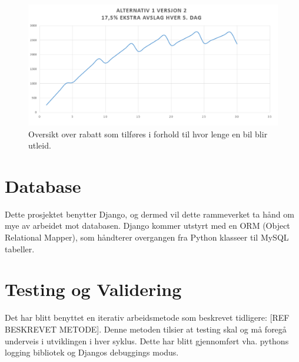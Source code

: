  \begin{figure}[htbp]
	\centering
		\includegraphics[scale=0.5]{Bilder/avslag.png}
	\caption[Utleiepris Diagram]{Oversikt over rabatt som tilføres i forhold til hvor lenge en bil blir utleid. } %
	\label{fig:price_reduction}
\end{figure}








\clearpage
\section{Database}
Dette prosjektet benytter Django, og dermed vil dette rammeverket ta hånd om mye av arbeidet mot databasen. Django kommer utstyrt med en ORM (Object Relational Mapper), som håndterer overgangen fra Python klasseer til MySQL tabeller. 

\clearpage
\section{Testing og Validering}
Det har blitt benyttet en iterativ arbeidsmetode som beskrevet tidligere: [REF BESKREVET METODE]. Denne metoden tilsier at testing skal og må foregå underveis i utviklingen i hver syklus. Dette har blitt gjennomført vha. pythons logging bibliotek og Djangos debuggings modus. 


